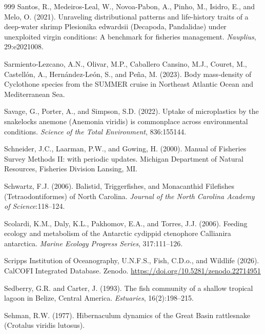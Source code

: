 \begin{thebibliography}{999}
Santos, R., Medeiros-Leal, W., Novoa-Pabon, A., Pinho, M., Isidro, E., and Melo, O. (2021). Unraveling distributional patterns and life-history traits of a deep-water shrimp Plesionika edwardsii (Decapoda, Pandalidae) under unexploited virgin conditions: A benchmark for fisheries management. \textit{Nauplius}, 29:e2021008.

Sarmiento-Lezcano, A.N., Olivar, M.P., Caballero Cansino, M.J., Couret, M., Castell\'{o}n, A., Hern\'{a}ndez-Le\'{o}n, S., and Pe\~{n}a, M. (2023). Body mass-density of Cyclothone species from the SUMMER cruise in Northeast Atlantic Ocean and Mediterranean Sea.

Savage, G., Porter, A., and Simpson, S.D. (2022). Uptake of microplastics by the snakelocks anemone (Anemonia viridis) is commonplace across environmental conditions. \textit{Science of the Total Environment}, 836:155144.

Schneider, J.C., Laarman, P.W., and Gowing, H. (2000). Manual of Fisheries Survey Methods II: with periodic updates. Michigan Department of Natural Resources, Fisheries Division Lansing, MI.

Schwartz, F.J. (2006). Balistid, Triggerfishes, and Monacanthid Filefishes (Tetraodontiformes) of North Carolina. \textit{Journal of the North Carolina Academy of Science}:118--124.

Scolardi, K.M., Daly, K.L., Pakhomov, E.A., and Torres, J.J. (2006). Feeding ecology and metabolism of the Antarctic cydippid ctenophore Callianira antarctica. \textit{Marine Ecology Progress Series}, 317:111--126.

Scripps Institution of Oceanography, U.N.F.S., Fish, C.D.o., and Wildlife (2026). Cal{COFI} Integrated Database. Zenodo. \url{https://doi.org/10.5281/zenodo.22714951}

Sedberry, G.R. and Carter, J. (1993). The fish community of a shallow tropical lagoon in Belize, Central America. \textit{Estuaries}, 16(2):198--215.

Sehman, R.W. (1977). Hibernaculum dynamics of the Great Basin rattlesnake (Crotalus viridis lutosus).


\end{thebibliography}
